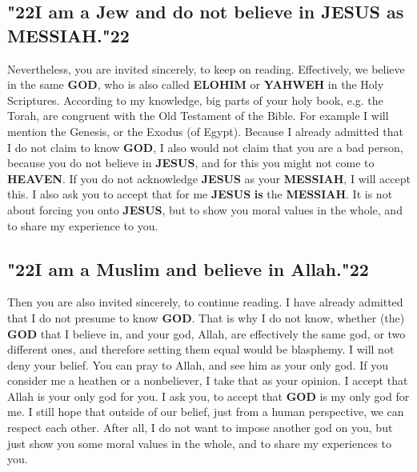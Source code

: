 \documentclass[10pt,a5paper]{article}
\newcommand{\God}[0]{\textbf{GOD}}
\newcommand{\Elohim}[0]{\textbf{ELOHIM}}
\newcommand{\Heaven}[0]{\textbf{HEAVEN}}
\newcommand{\Jesus}[0]{\textbf{JESUS}}
\newcommand{\Messiah}[0]{\textbf{MESSIAH}}
\newcommand{\Yahweh}[0]{\textbf{YAHWEH}}
\newcommand{\q}[1]{\char"22{#1}\char"22 }
\begin{document}
	\subsection{\q{I am a Jew and do not believe in {\Jesus} as {\Messiah}.}}
		Nevertheless,
		you are invited sincerely,
		to keep on reading.
		Effectively,
		we believe in the same {\God},
		who is also called {\Elohim} or {\Yahweh} in the Holy Scriptures.
		According to my knowledge,
		big parts of your holy book,
		e.g. the Torah,
		are congruent with the Old Testament of the Bible.
		For example I will mention the Genesis,
		or the Exodus (of Egypt).
		Because I already admitted that I do not claim to know {\God},
		I also would not claim that you are a bad person,
		because you do not believe in {\Jesus},
		and for this you might not come to {\Heaven}.
		If you do not acknowledge {\Jesus} as your {\Messiah},
		I will accept this.
		I also ask you to accept that for me {\Jesus} \textbf{is} the {\Messiah}.
		It is not about forcing you onto {\Jesus},
		but to show you moral values in the whole,
		and to share my experience to you.
		
	\subsection{\q{I am a Muslim and believe in Allah.}}
		Then you are also invited sincerely,
		to continue reading.
		I have already admitted
		that I do not presume to know {\God}.
		That is why I do not know,
		whether (the) {\God} that I believe in,
		and your god,
		Allah,
		are effectively the same god,
		or two different ones,
		and therefore setting them equal would be blasphemy.
		I will not deny your belief.
		You can pray to Allah,
		and see him as your only god.
		If you consider me a heathen or a nonbeliever,
		I take that as your opinion.
		I accept that Allah is your only god for you.
		I ask you,
		to accept that {\God} is my only god for me.
		I still hope that outside of our belief,
		just from a human perspective,
		we can respect each other.
		After all,
		I do not want to impose another god on you,
		but just show you some moral values in the whole,
		and to share my experiences to you.
	
\end{document}
